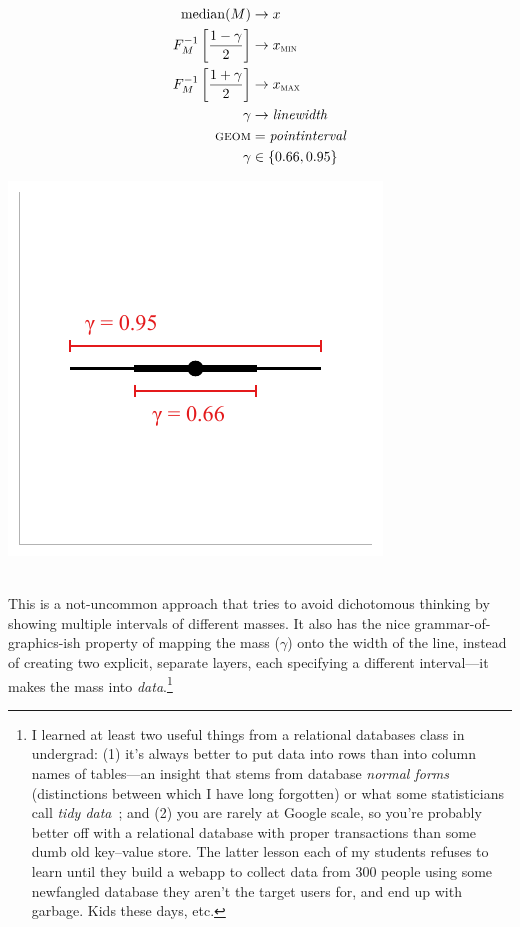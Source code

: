 \documentclass[journal]{vgtc}                     %
\newcommand{\equationfigure}[2]{%
\noindent
\begin{minipage}{.5\columnwidth}
\setlength{\abovedisplayskip}{0pt} %
\setlength{\belowdisplayskip}{0pt} %
#1\end{minipage}%
\begin{minipage}{.4\columnwidth}\centering #2 \end{minipage}%
\vspace{.5\belowdisplayskip}\\
}
\begin{document}
\equationfigure{
\begin{align*}
\operatorname{median}(M) &\rightarrow x\\
F_M^{-1}\left[\frac{1 - \gamma}{2}\right] &\rightarrow x_\textsc{min}\\
F_M^{-1}\left[\frac{1 + \gamma}{2}\right] &\rightarrow x_\textsc{max}\\
\gamma &\rightarrow \mathit{linewidth}\\
\textsc{geom} &= \mathit{pointinterval}\\
\gamma &\in \{0.66, 0.95\}
\end{align*}
}{\includegraphics[width=1.2\columnwidth]{figs/3-stat_pointinterval_linewidth.pdf}}
This is a not-uncommon approach that tries to avoid dichotomous thinking by showing multiple intervals of different masses. It also has the nice grammar-of-graphics-ish property of mapping the mass ($\gamma$) onto the width of the line, instead of creating two explicit, separate layers, each specifying a different interval---it makes the mass into \textit{data}.\footnote{I learned at least two useful things from a relational databases class in undergrad: (1) it's always better to put data into rows than into column names of tables---an insight that stems from database \textit{normal forms}~\cite{codd1990relational} (distinctions between which I have long forgotten) or what some statisticians call \textit{tidy data}~\cite{hadley2014tidy}; and (2) you are rarely at Google scale, so you're probably better off with a relational database with proper transactions than some dumb old key--value store. The latter lesson each of my students refuses to learn until they build a webapp to collect data from 300 people using some newfangled database they aren't the target users for, and end up with garbage. Kids these days, etc.}
\end{document}
